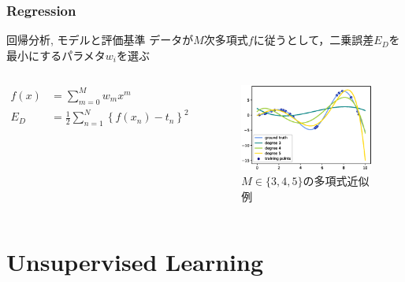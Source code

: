 \documentclass[dvipdfmx,platex]{beamer}
\begin{document}
\section{Regression}
\begin{frame}{{\mgfamily 回帰分析, モデルと評価基準}}
  データが$M$次多項式$f$に従うとして，二乗誤差$E_D$を最小にするパラメタ$w_{\textit{i}}$を選ぶ
  \begin{columns}[T,onlytextwidth]
    \begin{align*}
      f(x)&=\sum_{m=0}^{M}w_mx^{m}\\
      E_{D}&=\frac{1}{2}\sum_{n=1}^{N}{\left\{f(x_n)-t_n\right\}}^2
    \end{align*}
    \begin{figure}
      \centering
      \includegraphics[width=5cm]{fig/polyreg.eps}
      \caption{$M\in\{3,4,5\}${\mgfamily の多項式近似例}}
    \end{figure}
  \end{columns}
\end{frame}
\part{Unsupervised Learning}
\end{document}
